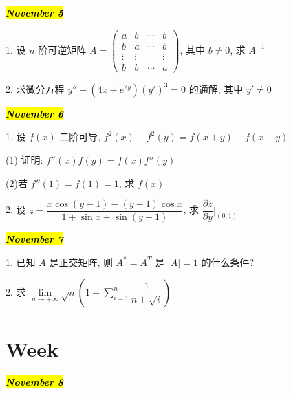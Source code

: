 \hl{\textbf{\textit{November 5}}}

1. 设 $n$ 阶可逆矩阵 
$A=\begin{pmatrix}
	   a   &    b   & \cdots &    b   \\
	   b   &    a   & \cdots &    b   \\
	\vdots & \vdots &        & \vdots \\
	   b   &    b   & \cdots &    a
\end{pmatrix}$, 其中 $b\neq 0$, 求 $A^{-1}$
\begin{solution}
	
\end{solution}

2. 求微分方程 $y''+(4x+e^{2y})(y')^3=0$ 的通解, 其中 $y'\neq 0$
\begin{solution}
	
\end{solution}

\hl{\textbf{\textit{November 6}}}

1. 设 $f(x)$ 二阶可导, $f^{2}(x)-f^{2}(y)=f(x+y)-f(x-y)$

(1) 证明: $f''(x)f(y)=f(x)f''(y)$

(2)若 $f''(1)=f(1)=1$, 求 $f(x)$
\begin{solution}
	
\end{solution}

2. 设 $\displaystyle{z=\dfrac{x\cos(y-1)-(y-1)\cos x}{1+\sin x+\sin(y-1)}}$, 求 $\dfrac{\partial z}{\partial y}|_{(0,1)}$
\begin{solution}
	
\end{solution}

\hl{\textbf{\textit{November 7}}}

1. 已知 $A$ 是正交矩阵, 则 $A^{*}=A^{T}$ 是 $|A|=1$ 的什么条件?
\begin{solution}
	
\end{solution}

2. 求 $\displaystyle{\lim\limits_{n\to +\infty}\sqrt{n}\left( 1-\sum\limits_{i=1}^{n}\dfrac{1}{n+\sqrt{i}}\right)}$
\begin{solution}
	
\end{solution}

\section{Week }
\hl{\textbf{\textit{November 8}}}


